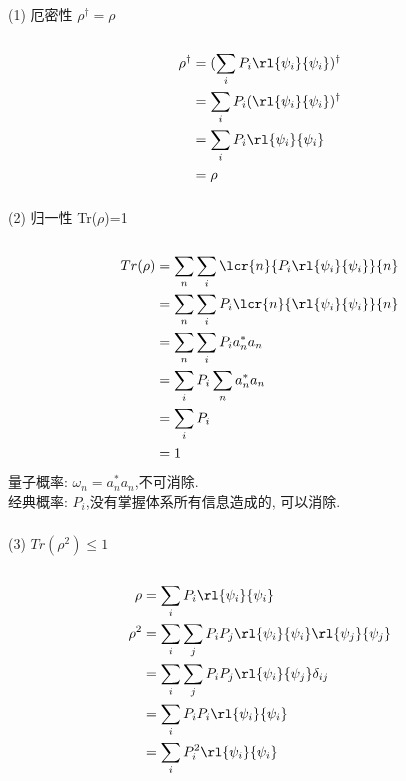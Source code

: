 \begin{frame} 
     \frametitle{}
      (1) 厄密性 $\rho ^{\dagger} = \rho$  \\ 
    \证~ 
    \[ \begin{aligned}
        \rho ^{\dagger} &= (\sum_i P_i\rl{\psi_i}{\psi_i} )^{\dagger} \\
        &= \sum_i P_i(\rl{\psi_i}{\psi_i} )^{\dagger} \\
        &= \sum_i P_i\rl{\psi_i}{\psi_i}  \\
        &= \rho
    \end{aligned}\] 
\end{frame}

\begin{frame} 
 \frametitle{}
      (2) 归一性 Tr($\rho$)=1 \\ 
      \证~
      \[ \begin{aligned}
        Tr(\rho) &= \sum_n \sum_i \lcr{n}{P_i\rl{\psi_i}{\psi_i}}{n} \\
        &= \sum_n \sum_i P_i\lcr{n}{\rl{\psi_i}{\psi_i}}{n}  \\
        &= \sum_n \sum_i P_i a_n^* a_n \\ 
        &= \sum_i P_i \sum_n a_n^* a_n \\ 
        &= \sum_i P_i \\ 
        &=1
      \end{aligned}\] 
      量子概率: $\omega_n= a_n^* a_n$,不可消除.\\ 
      经典概率: $P_i$,没有掌握体系所有信息造成的, 可以消除.
\end{frame}

\begin{frame} 
 \frametitle{}
      (3)  $Tr(\rho^2)\leq 1$  \\ 
      \证~
      \[ \begin{aligned}
        \rho & = \sum_i P_i\rl{\psi_i}{\psi_i} \\ 
        \rho^2 & = \sum_i\sum_j P_iP_j\rl{\psi_i}{\psi_i} \rl{\psi_j}{\psi_j} \\ 
        &= \sum_i\sum_j P_iP_j\rl{\psi_i}{\psi_j} \delta_{ij} \\ 
        &= \sum_i P_iP_i\rl{\psi_i}{\psi_i}  \\
        &=\sum_i P^2_i \rl{\psi_i}{\psi_i} 
    \end{aligned}\] 
    \end{frame}
    
